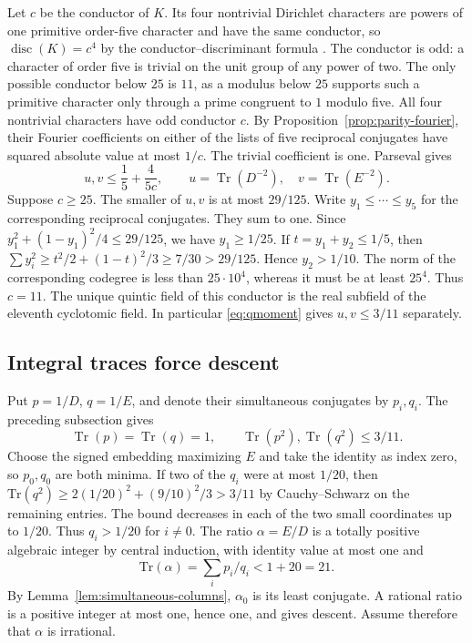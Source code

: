 \documentclass[11pt,a4paper]{article}
\numberwithin{equation}{section}
\begin{document}
Let $c$ be the conductor of $K$. Its four nontrivial Dirichlet characters
are powers of one primitive order-five character and have the same
conductor, so $\operatorname{disc}(K)=c^4$ by the conductor--discriminant
formula \cite{Was}. The conductor is odd: a character of order five is
trivial on the unit group of any power of two. The only possible conductor
below $25$ is $11$, as a modulus below $25$ supports such a primitive
character only through a prime congruent to $1$ modulo five. All four nontrivial characters have odd conductor $c$. By Proposition~\ref{prop:parity-fourier}, their Fourier coefficients on either of the lists of five reciprocal conjugates have squared absolute value at most $1/c$. The trivial coefficient is one. Parseval gives
\begin{equation}\label{eq:qmoment}
 u,v\le\frac15+\frac{4}{5c},\qquad
 u=\operatorname{Tr}(D^{-2}),\quad v=\operatorname{Tr}(E^{-2}).
\end{equation}
Suppose $c\ge25$. The smaller of $u,v$ is at most $29/125$. Write
$y_1\le\cdots\le y_5$ for the corresponding reciprocal conjugates.
They sum to one. Since $y_1^2+(1-y_1)^2/4\le29/125$, we have
$y_1\ge1/25$. If $t=y_1+y_2\le1/5$, then
$\sum y_i^2\ge t^2/2+(1-t)^2/3\ge7/30>29/125$.
Hence $y_2>1/10$. The norm of the corresponding codegree is
less than $25\cdot10^4$, whereas it must be at least $25^4$.
Thus $c=11$. The unique quintic field of this conductor is the real
subfield of the eleventh cyclotomic field. In particular
\eqref{eq:qmoment} gives $u,v\le3/11$ separately.



\subsection{Integral traces force descent}
\label{sec:quintic-trace}
Put $p=1/D$, $q=1/E$, and denote their simultaneous conjugates by
$p_i,q_i$. The preceding subsection gives
\[
 \operatorname{Tr}(p)=\operatorname{Tr}(q)=1,\qquad
 \operatorname{Tr}(p^2),\operatorname{Tr}(q^2)\le3/11.
\]
Choose the signed embedding maximizing $E$ and take the identity as index zero, so $p_0,q_0$ are both minima. If two of the $q_i$ were at most $1/20$, then $\mathrm{Tr}(q^2)\ge 2(1/20)^2+(9/10)^2/3>3/11$ by Cauchy--Schwarz on the remaining entries. The bound decreases in each of the two small coordinates up to $1/20$. Thus $q_i>1/20$ for $i\ne0$. The ratio $\alpha=E/D$ is a totally positive algebraic integer by central induction, with identity value at most one and
\[
   \mathrm{Tr}(\alpha)=\sum_i p_i/q_i<1+20=21 .
\]
By Lemma~\ref{lem:simultaneous-columns}, $\alpha_0$ is its least
conjugate. A rational ratio is a positive integer at most one, hence
one, and gives descent. Assume therefore that $\alpha$ is irrational.
\end{document}
